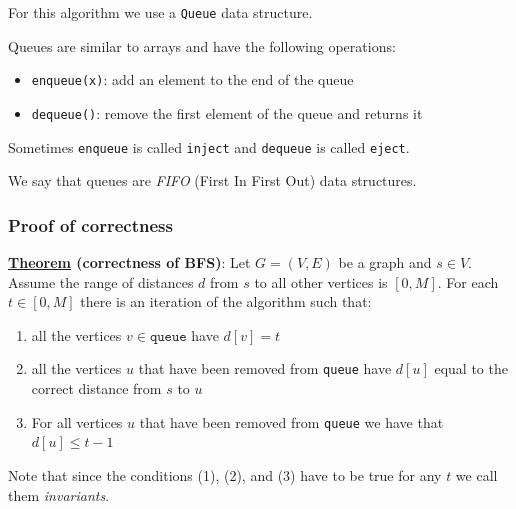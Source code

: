 \documentclass[10pt]{extarticle}
\begin{document}
For this algorithm we use a \texttt{Queue} data structure.

Queues are similar to arrays and have the following operations:
\begin{itemize}
    \item \texttt{enqueue(x)}: add an element to the end of the queue
    \item \texttt{dequeue()}: remove the first element of the queue and returns it
\end{itemize}

Sometimes \texttt{enqueue} is called \texttt{inject} and \texttt{dequeue} is called \texttt{eject}.

We say that queues are \textit{FIFO} (First In First Out) data structures.

\subsubsection{Proof of correctness}

\textbf{\underline{Theorem} (correctness of BFS)}: Let $G = (V, E)$ be a graph and $s \in V$.
Assume the range of distances $d$ from $s$ to all other vertices is $[0, M]$.
For each $t \in [0, M]$ there is an iteration of the algorithm such that:
\begin{enumerate}
    \item all the vertices $v \in \texttt{queue}$ have $d[v] = t$
    \item all the vertices $u$ that have been removed from \texttt{queue} have $d[u]$ equal to the correct distance from $s$ to $u$
    \item For all vertices $u$ that have been removed from \texttt{queue} we have that $d[u] \leq t - 1$
\end{enumerate}

Note that since the conditions (1), (2), and (3) have to be true for any $t$ we call them \textit{invariants}.
\end{document}
